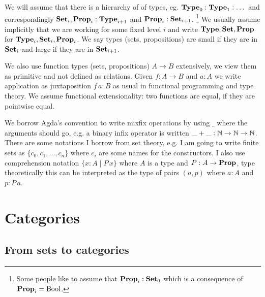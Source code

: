 We will assume that there is a hierarchy of of types, eg. $\mathbf{Type}_0 : \mathbf{Type}_1 : \dots$ and correspondingly $\mathbf{Set}_i,\mathbf{Prop}_i : \mathbf{Type}_{i+1}$ and $\mathbf{Prop}_i : \mathbf{Set}_{i+1}$.
\footnote{Some people like to assume that $\mathbf{Prop}_i : \mathbf{Set}_0$ which is a consequence of $\mathbf{Prop}_i = \mathrm{Bool}$.}
We usually assume implicitly that we are working for some fixed level $i$ and write $\mathbf{Type},\mathbf{Set},\mathbf{Prop}$ for $\mathbf{Type}_i,\mathbf{Set}_i,\mathbf{Prop}_i$. We say types (sets, propositions) are small if they are in $\mathbf{Set}_i$ and large if they are in $\mathbf{Set}_{i+1}$.


We also use function types (sets, propositions) $A \to B$  extensively, we view them as primitive and not defined as relations. Given $f : A \to B$ and $a : A$ we write application as juxtaposition $f\,a : B$ as usual in functional programming and type theory. We assume functional extensionality: two functions are equal, if they are pointwise equal. 

We borrow Agda's convention to write mixfix operations by using $\_$ where the arguments should go, e.g. a binary infix operator is written $\_+\_ : \mathbb{N} \to \mathbb{N} \to \mathbb{N}$. There are some notations I borrow from set theory, e.g. I am going to write finite sets as $\{c_0,c_1, \dots, c_n \}$ where $c_i$ are some names for the constructors. I also use comprehension notation $\{ x : A \mid P\,x \}$ where $A$ is a type and $P :A \to \mathbf{Prop}$, type theoretically this can be interpreted as the type of pairs $(a,p)$ where $a:A$ and $p : P\,a$.%

\section{Categories}
\label{sec:categories}

\subsection{From sets to categories}
\label{sec:from-sets-categories}

